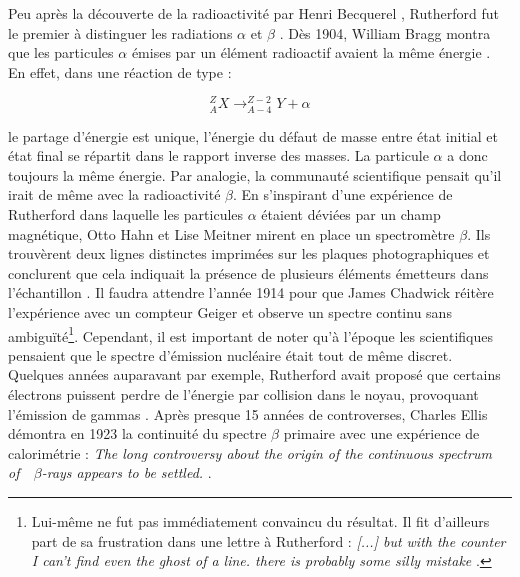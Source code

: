 \bigbreak

Peu après la découverte de la radioactivité par Henri Becquerel \cite{Becquerel:475481}, Rutherford fut le premier à distinguer les radiations $\alpha$ et $\beta$ \cite{Rutherford:261896}. Dès 1904, William Bragg montra que les particules $\alpha$ émises par un élément radioactif avaient la même énergie \cite{doi:10.1080/14786440409463245}. En effet, dans une réaction de type :

\begin{equation}
    ^{Z}_{A}X \rightarrow ^{Z-2}_{A-4}Y + \alpha
\end{equation}

\bigbreak

\noindent
le partage d'énergie est unique, l'énergie du défaut de masse entre état initial et état final se répartit dans le rapport inverse des masses. La particule $\alpha$ a donc toujours la même énergie. Par analogie, la communauté scientifique pensait qu'il irait de même avec la radioactivité $\beta$. En s'inspirant d'une expérience de Rutherford dans laquelle les particules $\alpha$ étaient déviées par un champ magnétique, Otto Hahn et Lise Meitner mirent en place un spectromètre $\beta$. Ils trouvèrent deux lignes distinctes imprimées sur les plaques photographiques et conclurent que cela indiquait la présence de plusieurs éléments émetteurs dans l'échantillon \cite{Baeyer:1911:SAN}. Il faudra attendre l'année 1914 pour que James Chadwick réitère l'expérience avec un compteur Geiger \cite{Chadwick:262756} et observe un spectre continu sans ambiguïté\footnote{Lui-même ne fut pas immédiatement convaincu du résultat. Il fit d'ailleurs part de sa frustration dans une lettre à Rutherford : \og \textit{[...] but with the counter I can’t find even the ghost of a line. there is probably some silly mistake} \fg{} \cite{brown1997neutron}.}. Cependant, il est important de noter qu'à l'époque les scientifiques pensaient que le spectre d'émission nucléaire était tout de même discret. Quelques années auparavant par exemple, Rutherford avait proposé que certains électrons puissent perdre de l'énergie par collision dans le noyau, provoquant l'émission de gammas \cite{doi:10.1080/14786441008637351}. Après presque 15 années de controverses, Charles Ellis démontra en 1923 la continuité du spectre $\beta$ primaire avec une expérience de calorimétrie : \og \textit{The long controversy about the origin of the continuous spectrum of\ \ $\beta$-rays appears to be settled.}\fg{} \cite{1927RSPSA.117..109E}.\\

